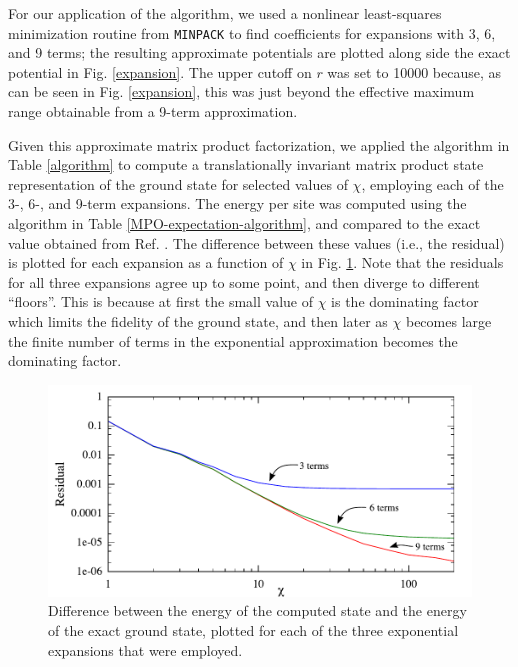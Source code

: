 \documentclass[12pt]{amsbook}
\theoremstyle{plain}
\theoremstyle{definition}
\theoremstyle{remark}
\begin{document}
For our application of the algorithm, we used a nonlinear least-squares minimization routine from \texttt{MINPACK} to find coefficients for expansions with 3, 6, and 9 terms;  the resulting approximate potentials are plotted along side the exact potential in Fig. \ref{expansion}.  The upper cutoff on $r$ was set to 10000 because, as can be seen in Fig. \ref{expansion}, this was just beyond the effective maximum range obtainable from a 9-term approximation.

Given this approximate matrix product factorization, we applied the algorithm in Table \ref{algorithm} to compute a translationally invariant matrix product state representation of the ground state for selected values of $\chi$, employing each of the 3-, 6-, and 9-term expansions.  The energy per site was computed using the algorithm in Table \ref{MPO-expectation-algorithm}, and compared to the exact value obtained from Ref. \cite{PhysRevLett.60.639}.  The difference between these values (i.e., the residual) is plotted for each expansion as a function of $\chi$ in Fig. \ref{residuals}.  Note that the residuals for all three expansions agree up to some point, and then diverge to different ``floors''.  This is because at first the small value of $\chi$ is the dominating factor which limits the fidelity of the ground state, and then later as $\chi$ becomes large the finite number of terms in the exponential approximation becomes the dominating factor.

\begin{figure}
\includegraphics[width=\columnwidth]{images/residuals}
\caption{Difference between the energy of the computed state and the energy of the exact ground state, plotted for each of the three exponential expansions that were employed.}
\label{residuals}
\end{figure}
\end{document}
